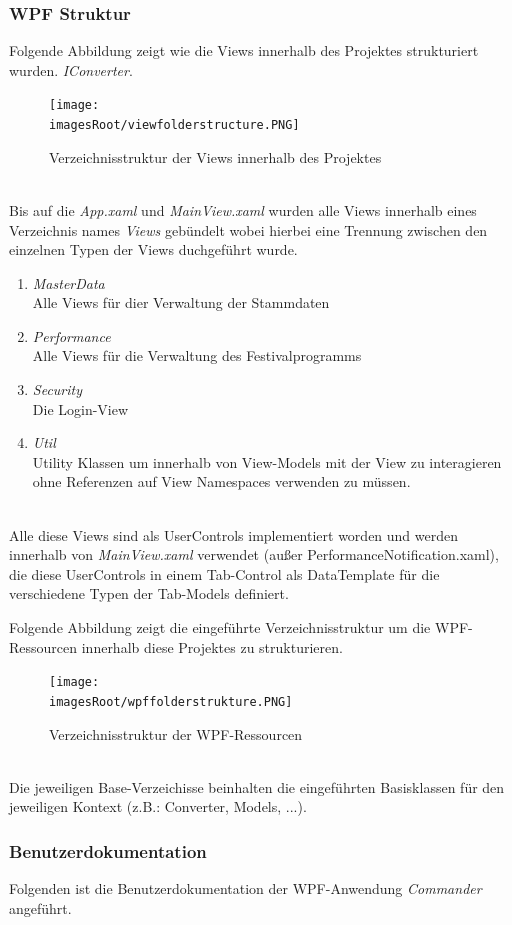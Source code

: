 \documentclass[11pt, a4paper, twoside]{article}   	%
\newcommand{\imagesRoot}{images}
\begin{document}
\subsubsection{WPF Struktur}
Folgende Abbildung zeigt wie die Views innerhalb des Projektes strukturiert wurden.
\emph{IConverter}.
\begin{figure}[h]
	\centering
	\texttt{[image: \\imagesRoot/viewfolderstructure.PNG]}
	\caption
	{Verzeichnisstruktur der Views innerhalb des Projektes}
\end{figure}
\ \\
Bis auf die \emph{App.xaml} und \emph{MainView.xaml} wurden alle Views innerhalb eines Verzeichnis names \emph{Views} gebündelt wobei hierbei eine Trennung zwischen den einzelnen Typen der Views duchgeführt wurde.
\begin{enumerate}
	\item\emph{MasterData}\\
	Alle Views für dier Verwaltung der Stammdaten
	\item\emph{Performance}\\
	Alle Views für die Verwaltung des Festivalprogramms
	\item\emph{Security}\\
	Die Login-View
	\item\emph{Util}\\
	Utility Klassen um innerhalb von View-Models mit der View zu interagieren ohne Referenzen auf View Namespaces verwenden zu müssen.
\end{enumerate}
\ \\
Alle diese Views sind als UserControls implementiert worden und werden innerhalb von \emph{MainView.xaml} verwendet (außer PerformanceNotification.xaml), die diese UserControls in einem Tab-Control als DataTemplate für die verschiedene Typen der Tab-Models definiert.

\newpage
Folgende Abbildung zeigt die eingeführte Verzeichnisstruktur um die WPF-Ressourcen innerhalb diese Projektes zu strukturieren.
\begin{figure}[h]
	\centering
	\texttt{[image: \\imagesRoot/wpffolderstrukture.PNG]}
	\caption
	{Verzeichnisstruktur der WPF-Ressourcen}
\end{figure}
\ \\
Die jeweiligen Base-Verzeichisse beinhalten die eingeführten Basisklassen für den jeweiligen Kontext (z.B.: Converter, Models, ...).

\newpage
\subsubsection{Benutzerdokumentation}
Folgenden ist die Benutzerdokumentation der WPF-Anwendung \emph{Commander} angeführt.
\end{document}
